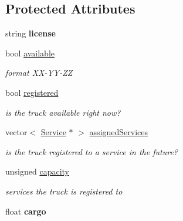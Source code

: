 \subsection*{Protected Attributes}
\begin{DoxyCompactItemize}
\item 
\mbox{\label{class_truck_a3dd293529f462f3a21838f9a6bc5a7d2}} 
string {\bfseries license}
\item 
\mbox{\label{class_truck_a4189fe5ed32f6084459a9c5ae1eb7c2a}} 
bool \hyperlink{class_truck_a4189fe5ed32f6084459a9c5ae1eb7c2a}{available}
\begin{DoxyCompactList}\small\item\em format X\+X-\/\+Y\+Y-\/\+ZZ \end{DoxyCompactList}\item 
\mbox{\label{class_truck_a80b8405cf7a15b236fef70116f99c4fb}} 
bool \hyperlink{class_truck_a80b8405cf7a15b236fef70116f99c4fb}{registered}
\begin{DoxyCompactList}\small\item\em is the truck available right now? \end{DoxyCompactList}\item 
\mbox{\label{class_truck_a3b153477458e5c93c1521ee2f4741638}} 
vector$<$ \hyperlink{class_service}{Service} $\ast$ $>$ \hyperlink{class_truck_a3b153477458e5c93c1521ee2f4741638}{assigned\+Services}
\begin{DoxyCompactList}\small\item\em is the truck registered to a service in the future? \end{DoxyCompactList}\item 
\mbox{\label{class_truck_ab004524786ae7aebf7c7bdb5e1599696}} 
unsigned \hyperlink{class_truck_ab004524786ae7aebf7c7bdb5e1599696}{capacity}
\begin{DoxyCompactList}\small\item\em services the truck is registered to \end{DoxyCompactList}\item 
\mbox{\label{class_truck_a1729700d52b22ff59b11b3238e6b0db8}} 
float {\bfseries cargo}
\end{DoxyCompactItemize}


